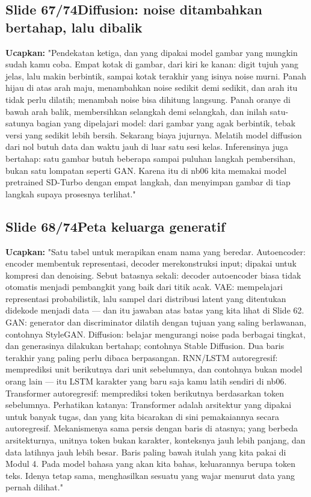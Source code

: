 \documentclass[11pt]{article}
\renewcommand{\framebox}[1]{\colorbox{acc!15}{\textcolor{acc}{\textbf{#1}}}}
\begin{document}
\subsection*{\framebox{Slide 67/74}\quad Diffusion: noise ditambahkan bertahap, lalu dibalik}
\textbf{Ucapkan:} "Pendekatan ketiga, dan yang dipakai model gambar yang mungkin sudah kamu coba. Empat kotak di gambar, dari kiri ke kanan: digit tujuh yang jelas, lalu makin berbintik, sampai kotak terakhir yang isinya noise murni. Panah hijau di atas arah maju, menambahkan noise sedikit demi sedikit, dan arah itu tidak perlu dilatih; menambah noise bisa dihitung langsung. Panah oranye di bawah arah balik, membersihkan selangkah demi selangkah, dan inilah satu-satunya bagian yang dipelajari model: dari gambar yang agak berbintik, tebak versi yang sedikit lebih bersih. Sekarang biaya jujurnya. Melatih model diffusion dari nol butuh data dan waktu jauh di luar satu sesi kelas. Inferensinya juga bertahap: satu gambar butuh beberapa sampai puluhan langkah pembersihan, bukan satu lompatan seperti GAN. Karena itu di nb06 kita memakai model pretrained SD-Turbo dengan empat langkah, dan menyimpan gambar di tiap langkah supaya prosesnya terlihat."\\[2pt]

\subsection*{\framebox{Slide 68/74}\quad Peta keluarga generatif}
\textbf{Ucapkan:} "Satu tabel untuk merapikan enam nama yang beredar. Autoencoder: encoder membentuk representasi, decoder merekonstruksi input; dipakai untuk kompresi dan denoising. Sebut batasnya sekali: decoder autoencoder biasa tidak otomatis menjadi pembangkit yang baik dari titik acak. VAE: mempelajari representasi probabilistik, lalu sampel dari distribusi latent yang ditentukan didekode menjadi data --- dan itu jawaban atas batas yang kita lihat di Slide 62. GAN: generator dan discriminator dilatih dengan tujuan yang saling berlawanan, contohnya StyleGAN. Diffusion: belajar mengurangi noise pada berbagai tingkat, dan generasinya dilakukan bertahap; contohnya Stable Diffusion. Dua baris terakhir yang paling perlu dibaca berpasangan. RNN/LSTM autoregresif: memprediksi unit berikutnya dari unit sebelumnya, dan contohnya bukan model orang lain --- itu LSTM karakter yang baru saja kamu latih sendiri di nb06. Transformer autoregresif: memprediksi token berikutnya berdasarkan token sebelumnya. Perhatikan katanya: Transformer adalah arsitektur yang dipakai untuk banyak tugas, dan yang kita bicarakan di sini pemakaiannya secara autoregresif. Mekanismenya sama persis dengan baris di atasnya; yang berbeda arsitekturnya, unitnya token bukan karakter, konteksnya jauh lebih panjang, dan data latihnya jauh lebih besar. Baris paling bawah itulah yang kita pakai di Modul 4. Pada model bahasa yang akan kita bahas, keluarannya berupa token teks. Idenya tetap sama, menghasilkan sesuatu yang wajar menurut data yang pernah dilihat."\\[2pt]
\end{document}
